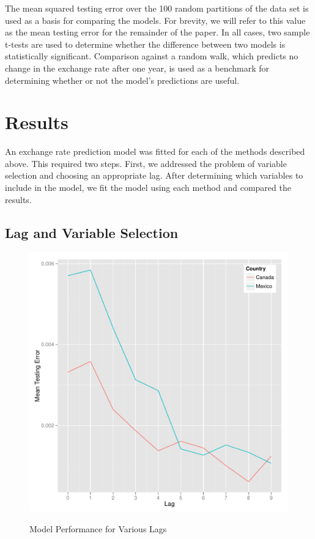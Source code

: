 \documentclass{sig-alternate-05-2015}
\begin{document}
\par{} The mean squared testing error over the 100 random partitions of the data set is used as a basis for comparing the models. For brevity, we will refer to this value as the mean testing error for the remainder of the paper. In all cases, two sample t-tests are used to determine whether the difference between two models is statistically significant. Comparison against a random walk, which predicts no change in the exchange rate after one year, is used as a benchmark for determining whether or not the model's predictions are useful.

\section{Results}

An exchange rate prediction model was fitted for each of the methods described above. This required two steps. First, we addressed the problem of variable selection and choosing an appropriate lag. After determining which variables to include in the model, we fit the model using each method and compared the results.

\subsection{Lag and Variable Selection}


\begin{figure}
\centering
\caption{Model Performance for Various Lags}
\includegraphics[scale=0.45]{lag1.pdf}
\label{fig:lag1}
\end{figure}
\end{document}
